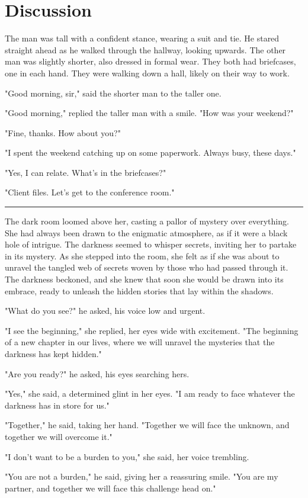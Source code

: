 \documentclass[smalldemyvopaper,11pt,twoside,onecolumn,openright,extrafontsizes]{memoir}
\begin{document}
\chapter{Discussion}
The man was tall with a confident stance, wearing a suit and tie. He stared straight ahead as he walked through the hallway, looking upwards. The other man was slightly shorter, also dressed in formal wear. They both had briefcases, one in each hand. They were walking down a hall, likely on their way to work.\par
"Good morning, sir," said the shorter man to the taller one.\par
"Good morning," replied the taller man with a smile. "How was your weekend?"\par
"Fine, thanks. How about you?"\par
"I spent the weekend catching up on some paperwork. Always busy, these days."\par
"Yes, I can relate. What's in the briefcases?"\par
"Client files. Let's get to the conference room."\par
\fancybreak{* * *}
The dark room loomed above her, casting a pallor of mystery over everything. She had always been drawn to the enigmatic atmosphere, as if it were a black hole of intrigue. The darkness seemed to whisper secrets, inviting her to partake in its mystery. As she stepped into the room, she felt as if she was about to unravel the tangled web of secrets woven by those who had passed through it. The darkness beckoned, and she knew that soon she would be drawn into its embrace, ready to unleash the hidden stories that lay within the shadows.\par
"What do you see?" he asked, his voice low and urgent.\par
"I see the beginning," she replied, her eyes wide with excitement. "The beginning of a new chapter in our lives, where we will unravel the mysteries that the darkness has kept hidden."\par
"Are you ready?" he asked, his eyes searching hers.\par
"Yes," she said, a determined glint in her eyes. "I am ready to face whatever the darkness has in store for us."\par
"Together," he said, taking her hand. "Together we will face the unknown, and together we will overcome it."\par
"I don't want to be a burden to you," she said, her voice trembling.\par
"You are not a burden," he said, giving her a reassuring smile. "You are my partner, and together we will face this challenge head on."\par
\end{document}
